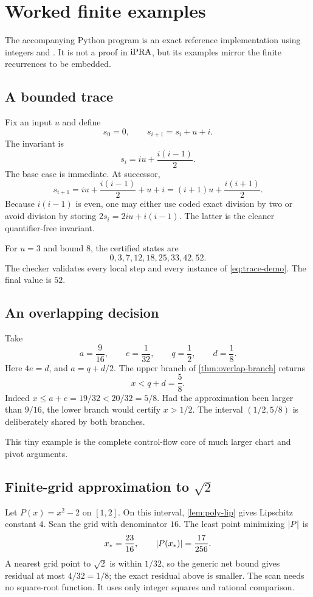 \section{Worked finite examples}
\label{sec:examples}

The accompanying Python program is an exact reference implementation using
integers and .  It is not a proof in \(\mathrm{iPRA}\), but
its examples mirror the finite recurrences to be embedded.

\subsection{A bounded trace}

Fix an input \(u\) and define
\[
 s_0=0,\qquad s_{i+1}=s_i+u+i.
\]
The invariant is
\[
 s_i=iu+\frac{i(i-1)}2.                         \tag{E1}\label{eq:trace-demo}
\]
The base case is immediate.  At successor,
\[
 s_{i+1}=iu+\frac{i(i-1)}2+u+i
 =(i+1)u+\frac{i(i+1)}2.
\]
Because \(i(i-1)\) is even, one may either use coded exact division by two or
avoid division by storing \(2s_i=2iu+i(i-1)\).  The latter is the cleaner
quantifier-free invariant.

For \(u=3\) and bound \(8\), the certified states are
\[
 0,3,7,12,18,25,33,42,52.
\]
The checker validates every local step and every instance of
\eqref{eq:trace-demo}.  The final value is \(52\).

\subsection{An overlapping decision}

Take
\[
 a=\frac9{16},\qquad e=\frac1{32},\qquad
 q=\frac12,\qquad d=\frac18.
\]
Here \(4e=d\), and
\(a=q+d/2\).  The upper branch of \cref{thm:overlap-branch} returns
\[
 x<q+d=\frac58.
\]
Indeed \(x\le a+e=19/32<20/32=5/8\).  Had the approximation been larger than
\(9/16\), the lower branch would certify \(x>1/2\).  The interval
\((1/2,5/8)\) is deliberately shared by both branches.

This tiny example is the complete control-flow core of much larger chart and
pivot arguments.

\subsection{Finite-grid approximation to \texorpdfstring{\(\sqrt2\)}{sqrt(2)}}

Let \(P(x)=x^2-2\) on \([1,2]\).  On this interval,
\cref{lem:poly-lip} gives Lipschitz constant \(4\).  Scan the grid with
denominator \(16\).  The least point minimizing \(\left|P\right|\) is
\[
 x_* = \frac{23}{16},
 \qquad
 \left|P(x_*)\right|=\frac{17}{256}.
\]
A nearest grid point to \(\sqrt2\) is within \(1/32\), so the generic net
bound gives residual at most \(4/32=1/8\); the exact residual above is smaller.
The scan needs no square-root function.  It uses only integer squares and
rational comparison.

